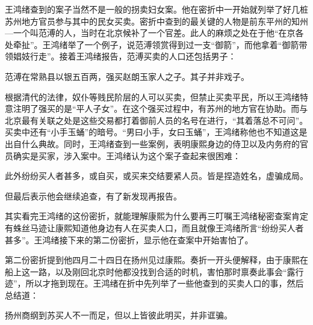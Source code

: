 
王鸿绪查到的案子当然不是一般的拐卖妇女案。他在密折中一开始就列举了好几桩苏州地方官员参与其中的民女买卖。密折中查到的最关键的人物是前东平州的知州—一个叫范溥的人，当时在北京候补了一个官差。此人的麻烦之处在于他“在京各处牵扯”。王鸿绪举了一个例子，说范溥领赏得到过一支“御箭”，而他拿着“御箭带领娼妓行走”。接着王鸿绪报告，范溥买卖的人口还包括男子：



\begin{bookquote}范溥在常熟县以银五百两，强买赵朗玉家人之子。其子并非戏子。\end{bookquote}


根据清代的法律，奴仆等贱民阶层的人可以买卖，但禁止买卖平民，所以王鸿绪特意注明了强买的是“平人子女”。在这个强买过程中，有苏州的地方官在协助。而与北京最有关联之处是这些交易都打着御前人员的名号在进行，“其着落总不可问”。买卖中还有“小手玉蛹”的暗号。“男曰小手，女曰玉蛹”，王鸿绪称他也不知道这是出自什么典故。同时，王鸿绪查到一些案例，表明康熙身边的侍卫以及内务府的官员确实是买家，涉入案中。王鸿绪认为这个案子查起来很困难：



\begin{bookquote}此外纷纷买人者甚多，或自买，或买来交结要紧人员。皆是捏造姓名，虚骗成局。\end{bookquote}


但最后表示他会继续追查，有了新发现再报告。



其实看完王鸿绪的这份密折，就能理解康熙为什么要再三叮嘱王鸿绪秘密查案肯定有蛛丝马迹让康熙知道他身边有人在买卖人口，而且就像王鸿绪所言“纷纷买人者甚多”。王鸿绪接下来的第二份密折，显示他在查案中开始害怕了。



第二份密折提到他四月二十四日在扬州见过康熙。奏折一开头便解释，由于康熙在船上这一路，以及刚回北京时他都没找到合适的时机，害怕那时禀奏此事会“露行迹”，所以才拖到现在。王鸿绪在折中先列举了一些他查到的买卖人口的事，然后总结道：



\begin{bookquote}扬州商纲到苏买人不一而足，但以上皆彼此明买，并非诓骗。\end{bookquote}


